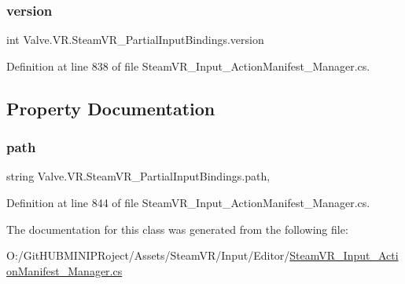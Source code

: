\subsubsection{\texorpdfstring{version}{version}}
{\footnotesize\ttfamily int Valve.\+V\+R.\+Steam\+V\+R\+\_\+\+Partial\+Input\+Bindings.\+version}



Definition at line 838 of file Steam\+V\+R\+\_\+\+Input\+\_\+\+Action\+Manifest\+\_\+\+Manager.\+cs.



\subsection{Property Documentation}
\mbox{\label{class_valve_1_1_v_r_1_1_steam_v_r___partial_input_bindings_a60dc5f8f20423732fe072d006cb56d16}} 
\subsubsection{\texorpdfstring{path}{path}}
{\footnotesize\ttfamily string Valve.\+V\+R.\+Steam\+V\+R\+\_\+\+Partial\+Input\+Bindings.\+path\hspace{0.3cm}{\ttfamily [get]}, {\ttfamily [set]}}



Definition at line 844 of file Steam\+V\+R\+\_\+\+Input\+\_\+\+Action\+Manifest\+\_\+\+Manager.\+cs.



The documentation for this class was generated from the following file\+:\begin{DoxyCompactItemize}
\item 
O\+:/\+Git\+H\+U\+B\+M\+I\+N\+I\+P\+Roject/\+Assets/\+Steam\+V\+R/\+Input/\+Editor/\mbox{\hyperlink{_steam_v_r___input___action_manifest___manager_8cs}{Steam\+V\+R\+\_\+\+Input\+\_\+\+Action\+Manifest\+\_\+\+Manager.\+cs}}\end{DoxyCompactItemize}
